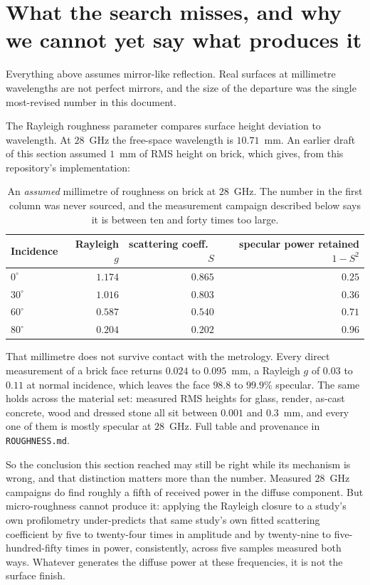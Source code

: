 \documentclass[11pt,a4paper]{article}
\begin{document}
\section{What the search misses, and why we cannot yet say what produces it}

Everything above assumes mirror-like reflection. Real surfaces at millimetre
wavelengths are not perfect mirrors, and the size of the departure was the single
most-revised number in this document.

The Rayleigh roughness parameter compares surface height deviation to
wavelength. At $28$~GHz the free-space wavelength is $10.71$~mm. An earlier draft
of this section assumed $1$~mm of RMS height on brick, which gives, from this
repository's implementation:

\begin{table}[h]
\centering
\begin{tabular}{lrrr}
\toprule
Incidence & Rayleigh $g$ & scattering coeff.\ $S$ & specular power retained $1-S^2$ \\
\midrule
$0^\circ$  & $1.174$ & $0.865$ & $0.25$ \\
$30^\circ$ & $1.016$ & $0.803$ & $0.36$ \\
$60^\circ$ & $0.587$ & $0.540$ & $0.71$ \\
$80^\circ$ & $0.204$ & $0.202$ & $0.96$ \\
\bottomrule
\end{tabular}
\caption{An \emph{assumed} millimetre of roughness on brick at $28$~GHz. The
number in the first column was never sourced, and the measurement campaign
described below says it is between ten and forty times too large.}
\end{table}

That millimetre does not survive contact with the metrology. Every direct
measurement of a brick face returns $0.024$ to $0.095$~mm, a Rayleigh $g$ of
$0.03$ to $0.11$ at normal incidence, which leaves the face $98.8$ to $99.9\%$
specular. The same holds across the
material set: measured RMS heights for glass, render, as-cast concrete, wood and
dressed stone all sit between $0.001$ and $0.3$~mm, and every one of them is
mostly specular at $28$~GHz. Full table and provenance in \texttt{ROUGHNESS.md}.

So the conclusion this section reached may still be right while its mechanism is
wrong, and that distinction matters more than the number. Measured $28$~GHz
campaigns do find roughly a fifth of received power in the diffuse component. But
micro-roughness cannot produce it: applying the Rayleigh closure to a study's own
profilometry under-predicts that same study's own fitted scattering coefficient by
five to twenty-four times in amplitude and by twenty-nine to five-hundred-fifty
times in power, consistently, across five samples measured both ways. Whatever
generates the diffuse power at these frequencies, it is not the surface finish.
\end{document}
